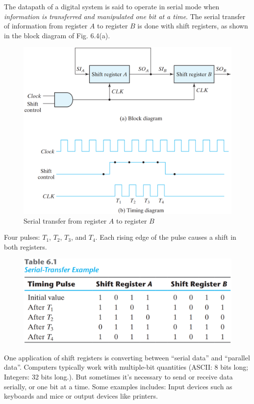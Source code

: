 The datapath of a digital system is said to operate in serial mode when \textit{information is transferred and manipulated one bit at a time}. The serial transfer of information from register $A$ to register $B$ is done with shift registers, as shown in the block diagram of Fig. 6.4(a).
\begin{figure}[H]
  \centering
  \includegraphics[width=\linewidth]{img/fig-6.4.png}
  \caption{Serial transfer from register $A$ to register $B$}
  \label{fig:6.4}
\end{figure}
\noindent Four pulses: $T_1$, $T_2$, $T_3$, and $T_4$. Each rising edge of the pulse causes a shift in both registers.
\begin{figure}[H]
  \centering
  \includegraphics[width=\linewidth]{img/table-6.1.png}
  \label{table:6.1}
\end{figure}

One application of shift registers is converting between ``serial data'' and ``parallel data''. Computers typically work with multiple-bit quantities (ASCII: 8 bits long; Integers: 32 bits long.). But sometimes it's necessary to send or receive data serially, or one bit at a time. Some examples includes: Input devices such as keyboards and mice or output devices like printers.

